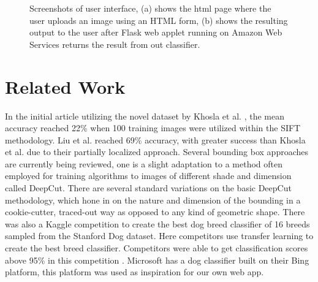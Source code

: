 \documentclass[12pt]{article}
\begin{document}
\begin{figure}[H]
\vspace{1cm}
\caption{Screenshots of user interface, (a) shows the html page where the user uploads an image using an HTML form, (b) shows the resulting output to the user after Flask web applet running on Amazon Web Services returns the result from out classifier.}
\end{figure}


\section{Related Work}

In the initial article utilizing the novel dataset by Khosla et al. \cite{khosla2011novel}, the mean accuracy reached 22\% when 100 training images were utilized within the SIFT methodology. Liu et al. \cite{liu2012dog} reached 69\% accuracy, with greater success than Khosla et al. \cite{khosla2011novel} due to their partially localized approach. Several bounding box approaches are currently being reviewed, one is a slight adaptation to a method often employed for training algorithms to images of different shade and dimension called DeepCut. \cite{rajchl2016deepcut} There are several standard variations on the basic DeepCut methodology, which hone in on the nature and dimension of the bounding in a cookie-cutter, traced-out way as opposed to any kind of geometric shape. There was also a Kaggle competition to create the best dog breed classifier of 16 breeds sampled from the Stanford Dog dataset. Here competitors use transfer learning to create the best breed classifier. Competitors were able to get classification scores above 95\% in this competition \cite{kaggledogs}. Microsoft has a dog classifier built on their Bing platform, this platform was used as inspiration for our own web app.
\end{document}
